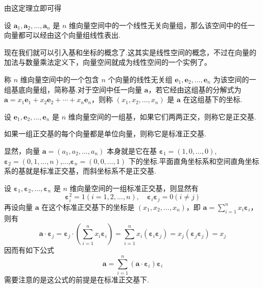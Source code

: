 由这定理立即可得

\begin{theorem}
  设 $\bm{a}_1, \bm{a}_2, \ldots, \bm{a}_n$ 是 $n$
  维向量空间中的一个线性无关向量组，那么该空间中的任一向量都可以经由这个向量组线性表出.
\end{theorem}


现在我们就可以引入基和坐标的概念了.这其实是线性空间的概念，不过在向量的加法与数量乘法定义下，向量空间就成为线性空间的一个实例了。

\begin{definition}
  称 $n$ 维向量空间中的一个包含 $n$ 个向量的线性无关组
  $\bm{e}_1, \bm{e}_2, \ldots, \bm{e}_n$
  为该空间的一组基底向量组，简称基.对于空间中任一向量
  $\bm{a}$，若它经由这组基的分解式为 $\bm{a}= x_1
  \bm{e}_1 + x_2 \bm{e}_2 + \cdots + x_n \bm{e}_n$，则称
  $(x_1, x_2, \ldots, x_n)$ 是 $\bm{a}$ 在这组基下的坐标.
\end{definition}

\begin{definition}
  设 $\bm{e}_1, \bm{e}_2, \ldots, \bm{e}_n$ 是 $n$
  维向量空间的一组基，如果它们两两正交，则称它是正交基.
\end{definition}

\begin{definition}
  如果一组正交基的每个向量都是单位向量，则称它是标准正交基.
\end{definition}

显然，向量 $\bm{a}= (a_1, a_2, \ldots, a_n)$ 本身就是它在基
$\bm{\varepsilon}_1 = (1, 0, \ldots, 0)$, $\bm{\varepsilon}_2 =
(0, 1, \ldots, n)$,...,$\bm{\varepsilon}_n = (0, 0, \ldots, 1)$
下的坐标.平面直角坐标系和空间直角坐标系的基就是标准正交基，而斜坐标系不是正交基.

设 $\bm{\varepsilon}_1, \bm{\varepsilon}_2, \ldots,
\bm{\varepsilon}_n$ 是 $n$
维向量空间的一组标准正交基，则显然有
\[ \bm{\varepsilon}_i^2 = 1 (i = 1, 2, \ldots, n), \hspace{1em}
   \bm{\varepsilon}_i \bm{\varepsilon}_j = 0 (i \neq j) \]
再设向量 $\bm{a}$ 在这个标准正交基下的坐标是 $(x_1,
x_2, \ldots, x_n)$，即 $\bm{a}= \sum_{i = 1}^n x_i
\bm{\varepsilon}_i$，则有
\[ \bm{a} \cdot \bm{\varepsilon}_j =\bm{\varepsilon}_j \cdot
   \left( \sum_{i = 1}^n x_i \bm{\varepsilon}_i \right) = \sum_{i = 1}^n
   x_i (\bm{\varepsilon}_i \bm{\varepsilon}_j) = x_j
   (\bm{\varepsilon}_j \bm{\varepsilon}_j) = x_j \]
因而有如下公式
\[ \bm{a}= \sum_{i = 1}^n (\bm{a} \cdot \bm{\varepsilon}_i)
   \bm{\varepsilon}_i \]
需要注意的是这公式的前提是在标准正交基下.


